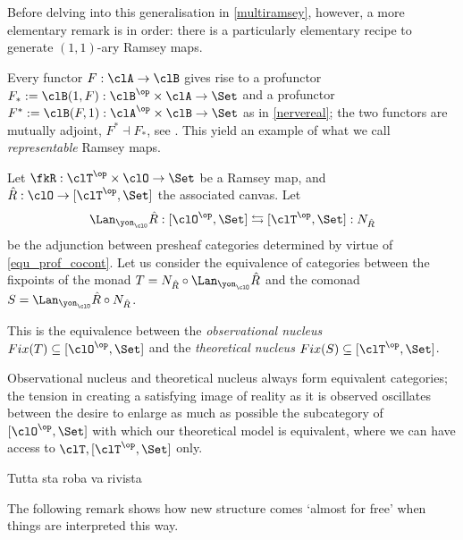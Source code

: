 Before delving into this generalisation in \autoref{multiramsey}, however, a more elementary remark is in order: there is a particularly elementary recipe to generate $(1,1)$-ary Ramsey maps.
\begin{example}
	Every functor $F : \clA \to \clB$ gives rise to a profunctor $F_* := \clB(1,F) : \clB^\op\times \clA\to\Set$ and a profunctor $F^* := \clB(F,1) : \clA^\op\times\clB \to \Set$ as in \autoref{nervereal}; the two functors are mutually adjoint, $F^*\dashv F_*$, see \cite[6.2]{Bor2}. This yield an example of what we call \emph{representable} Ramsey maps.
\end{example}
\begin{definition}\label{nuclei}
	Let $\fkR : \clT^\op\times \clO \to\Set$ be a Ramsey map, and $\hat R : \clO \to [\clT^\op,\Set]$ the associated canvas. Let
	\[ \label{lalan} \Lan_{\yon_\clO}\hat R : [\clO^\op,\Set] \leftrightarrows [\clT^\op,\Set] : N_{\hat R} \]
	be the adjunction between presheaf categories determined by virtue of \autoref{equ_prof_cocont}. Let us consider the equivalence of categories between the fixpoints of the monad $T = N_{\hat R}\circ\Lan_{\yon_\clO}\hat R$ and the comonad $S=\Lan_{\yon_\clO}\hat R\circ N_{\hat R}$.
	
	This is the equivalence between the \emph{observational nucleus} $Fix(T)\subseteq [\clO^\op,\Set]$ and the \emph{theoretical nucleus} $Fix(S)\subseteq [\clT^\op,\Set]$.
\end{definition}
\begin{remark}
	Observational nucleus and theoretical nucleus always form equivalent categories; the tension in creating a satisfying image of reality as it is observed oscillates between the desire to enlarge as much as possible the subcategory of $[\clO^\op,\Set]$ with which our theoretical model is equivalent, where we can have access to $\clT, [\clT^\op, \Set]$ only.
\end{remark}
{\color{blue} Tutta sta roba va rivista}

\color{red}
The following remark shows how new structure comes `almost for free' when things are interpreted this way. 

